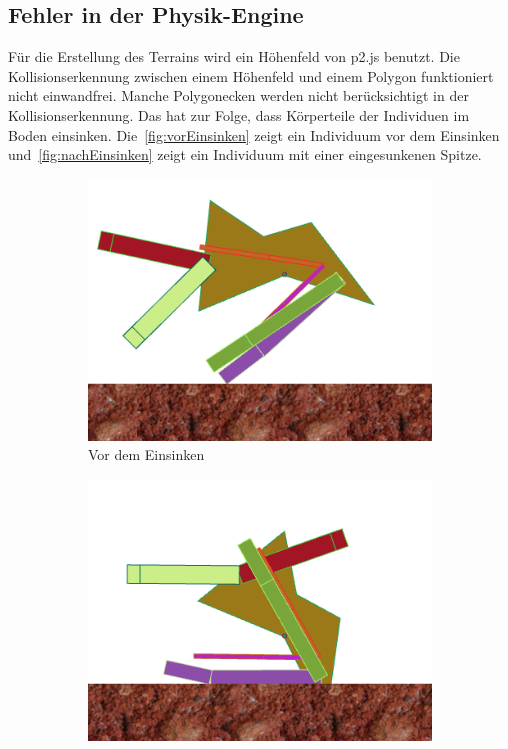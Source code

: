     \subsection{Fehler in der Physik-Engine}

      Für die Erstellung des Terrains wird ein Höhenfeld von p2.js benutzt.
      Die Kollisionserkennung zwischen einem Höhenfeld und einem Polygon funktioniert nicht einwandfrei.
      Manche Polygonecken werden nicht berücksichtigt in der Kollisionserkennung.
      Das hat zur Folge, dass Körperteile der Individuen im Boden einsinken.
      Die~\vref{fig:vorEinsinken} zeigt ein Individuum vor dem Einsinken
      und~\vref{fig:nachEinsinken} zeigt ein Individuum mit einer eingesunkenen Spitze.

      \begin{figure}[H]
        \centering
        \begin{subfigure}[b]{0.45\textwidth}
          \includegraphics[width=\linewidth,center]{graphics/physics-engine/sink-0}
          \caption{Vor dem Einsinken\label{fig:vorEinsinken}}
        \end{subfigure}
        \qquad
        \begin{subfigure}[b]{0.45\textwidth}
          \includegraphics[width=\linewidth,center]{graphics/physics-engine/sink-1}

\end{subfigure}
\end{figure}

